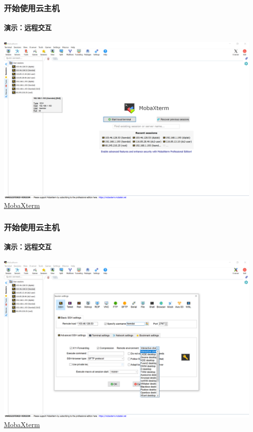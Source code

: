 \documentclass[10pt]{beamer}
\begin{document}
        \begin{frame}
            \frametitle{开始使用云主机}
                \framesubtitle{演示：远程交互}

                \centering

                \href{https://mobaxterm.mobatek.net}{
                    \includegraphics[width=\textwidth]{src/img/MobaXterm.png} \\
                    {\small MobaXterm}
                    }

        \end{frame}

        \begin{frame}
            \frametitle{开始使用云主机}
                \framesubtitle{演示：远程交互}

                \centering

                \href{https://mobaxterm.mobatek.net}{
                    \includegraphics[width=\textwidth]{src/img/Session.png} \\
                    {\small MobaXterm}
                    }

        \end{frame}
\end{document}
